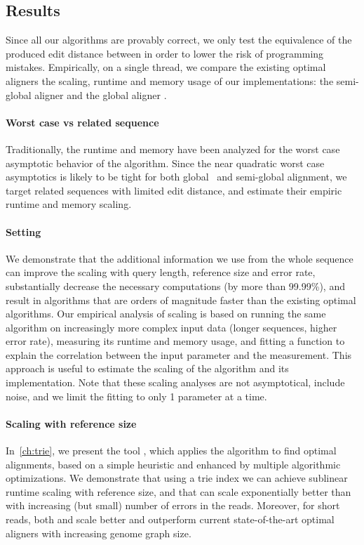 \subsection*{Results}

Since all our algorithms are provably correct, we only test the equivalence of
the produced edit distance between in order to lower the risk of programming
mistakes. Empirically, on a single thread, we compare the existing optimal
aligners the scaling, runtime and memory usage of our implementations: the
semi-global aligner \astarix and the global aligner \astarpa.

\paragraph{Worst case vs related sequence}
Traditionally, the runtime and memory have been analyzed for the worst case
asymptotic behavior of the algorithm. Since the near quadratic worst case
asymptotics is likely to be tight for both global~\citep{backurs2015edit} and
semi-global alignment, we target related sequences with limited edit distance,
and estimate their empiric runtime and memory scaling.

\paragraph{Setting}
We demonstrate that the additional information we use from the whole sequence
can improve the scaling with query length, reference size and error rate,
substantially decrease the necessary computations (by more than 99.99\%), and
result in algorithms that are orders of magnitude faster than the existing
optimal algorithms. Our empirical analysis of scaling is based on running the
same algorithm on increasingly more complex input data (longer sequences, higher
error rate), measuring its runtime and memory usage, and fitting a function to
explain the correlation between the input parameter and the measurement. This
approach is useful to estimate the scaling of the algorithm and its
implementation. Note that these scaling analyses are not asymptotical, include
noise, and we limit the fitting to only 1 parameter at a time.

\paragraph{Scaling with reference size}
In~\cref{ch:trie}, we present the tool \astarix, which applies the \A algorithm
to find optimal alignments, based on a simple heuristic and enhanced by multiple
algorithmic optimizations. We demonstrate that using a trie index we can achieve
sublinear runtime scaling with reference size, and that \A can scale
exponentially better than \dijkstra with increasing (but small) number of errors
in the reads. Moreover, for short reads, both \astarix and \dijkstra scale
better and outperform current state-of-the-art optimal aligners with increasing
genome graph size.

